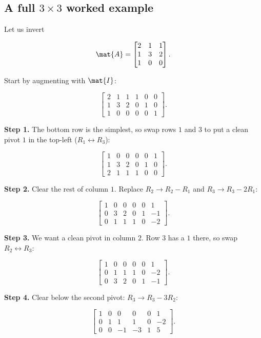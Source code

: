 \subsection{A full $3\times3$ worked example}

Let us invert

\[
\mat{A} = \begin{bmatrix} 2 & 1 & 1 \\ 1 & 3 & 2 \\ 1 & 0 & 0 \end{bmatrix}.
\]

Start by augmenting with $\mat{I}$:

\[
\left[\begin{array}{ccc|ccc}
2 & 1 & 1 & 1 & 0 & 0 \\
1 & 3 & 2 & 0 & 1 & 0 \\
1 & 0 & 0 & 0 & 0 & 1
\end{array}\right].
\]

\textbf{Step 1.} The bottom row is the simplest, so swap rows $1$ and $3$ to put a clean
pivot $1$ in the top-left ($R_1 \leftrightarrow R_3$):

\[
\left[\begin{array}{ccc|ccc}
1 & 0 & 0 & 0 & 0 & 1 \\
1 & 3 & 2 & 0 & 1 & 0 \\
2 & 1 & 1 & 1 & 0 & 0
\end{array}\right].
\]

\textbf{Step 2.} Clear the rest of column $1$. Replace $R_2 \to R_2 - R_1$ and
$R_3 \to R_3 - 2R_1$:

\[
\left[\begin{array}{ccc|ccc}
1 & 0 & 0 & 0 & 0 & 1 \\
0 & 3 & 2 & 0 & 1 & -1 \\
0 & 1 & 1 & 1 & 0 & -2
\end{array}\right].
\]

\textbf{Step 3.} We want a clean pivot in column $2$. Row $3$ has a $1$ there, so swap
$R_2 \leftrightarrow R_3$:

\[
\left[\begin{array}{ccc|ccc}
1 & 0 & 0 & 0 & 0 & 1 \\
0 & 1 & 1 & 1 & 0 & -2 \\
0 & 3 & 2 & 0 & 1 & -1
\end{array}\right].
\]

\textbf{Step 4.} Clear below the second pivot: $R_3 \to R_3 - 3R_2$:

\[
\left[\begin{array}{ccc|ccc}
1 & 0 & 0 & 0 & 0 & 1 \\
0 & 1 & 1 & 1 & 0 & -2 \\
0 & 0 & -1 & -3 & 1 & 5
\end{array}\right].
\]

